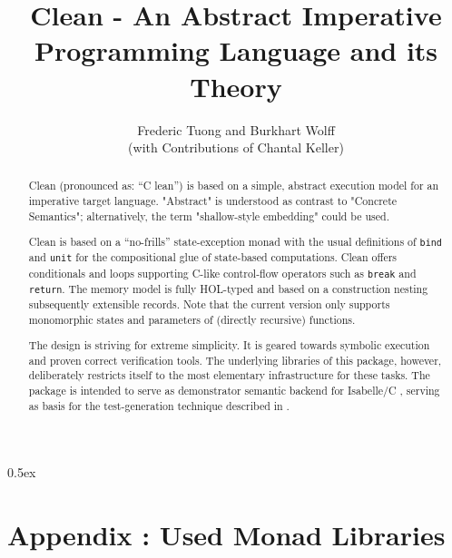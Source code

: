 \documentclass[fontsize=11pt,paper=a4,open=right,twoside,abstract=true]{scrreprt}
\newcommand{\HOL}{HOL}
\begin{document}
\title{Clean - An Abstract Imperative Programming Language and its Theory}
\author{Frederic Tuong and Burkhart Wolff \\ (with Contributions of Chantal Keller)}
\maketitle

\begin{abstract}
Clean (pronounced as: ``C lean'') is based on a simple, abstract execution model for an 
imperative target language. "Abstract" is understood as contrast to "Concrete Semantics";
alternatively, the term "shallow-style embedding" could be used.  

Clean is based on a ``no-frills'' state-exception monad  with the 
usual definitions of \verb+bind+ and \verb+unit+ for the compositional glue of
state-based computations. Clean offers conditionals and loops supporting C-like 
control-flow operators such as \verb+break+ and \verb+return+.
The memory model is fully \HOL -typed and based on a construction nesting
subsequently extensible records. Note that the current version only supports
monomorphic states and parameters of (directly recursive) functions.

The design is striving for extreme simplicity. It is geared towards symbolic execution and
proven correct verification tools. The underlying libraries of this package, however,
deliberately restricts itself to the most elementary infrastructure for these tasks. 
The package is intended to serve as demonstrator semantic backend for Isabelle/C \cite{TuongWolff19},
serving as basis for the test-generation technique described in \cite{DBLP:conf/tap/Keller18} .
\end{abstract}

\newpage
\tableofcontents

\parindent 0pt\parskip 0.5ex

% 
\newpage




\newpage
\section{Appendix : Used Monad Libraries}













\end{document}
